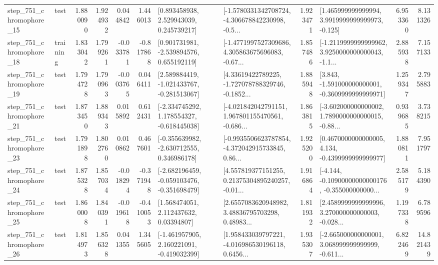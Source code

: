 \begin{tabular}{llrrrrllrlrr}
  step\_751\_chromophore\_15 &      test &      1.880090 &    1.924932 &      0.044842 &  1.446013 &     [0.893458938, 2.529943039, 0.245739217] &  [-1.5780331342708724, -4.306678842230998, -0.5... &       1.923471 &    [1.465999999999994, 3.9919999999999973, -0.125] &            6.953360 &          8.131326 \\
  step\_751\_chromophore\_18 &  training &      1.833042 &    1.799261 &     -0.033781 & -0.817868 &    [0.901731981, -2.539894576, 0.655192119] &  [-1.4771997527309686, 4.305863675696083, -0.67... &       1.857486 &  [-1.2119999999999962, 3.9250000000000043, -1.1... &            2.885938 &          7.157133 \\
  step\_751\_chromophore\_19 &      test &      1.794728 &    1.790963 &     -0.003765 &  0.046411 &   [2.589884419, -1.021433767, -0.281513067] &  [4.33619422789225, -1.727078788329746, -0.1852... &       1.885948 &   [3.843, -1.591000000000001, -0.3609999999999971] &            1.259347 &          2.795883 \\
  step\_751\_chromophore\_21 &      test &      1.873450 &    1.889343 &      0.015892 &  0.612431 &   [-2.334745292, 1.178554327, -0.618445038] &  [-4.021842042791151, 1.967801155470561, -0.686... &       1.863815 &  [-3.602000000000002, 1.7890000000000015, -0.88... &            0.939685 &          3.738215 \\
  step\_751\_chromophore\_23 &      test &      1.791898 &    1.802760 &      0.010862 &  0.467601 &   [-0.355639982, -2.630712555, 0.346986178] &  [-0.9935506623787854, -4.372042915733845, 0.86... &       1.925200 &   [0.4670000000000005, 4.134, -0.4399999999999977] &            1.880811 &          7.951797 \\
  step\_751\_chromophore\_24 &      test &      1.875328 &    1.857034 &     -0.018294 & -0.371948 &  [-2.682196459, -0.059103476, -0.351698479] &  [4.557819377151255, 0.21375304895240257, -0.01... &       1.916864 &  [-4.144, -0.10900000000000176, -0.355000000000... &            2.585179 &          5.184390 \\
  step\_751\_chromophore\_25 &      test &      1.860008 &    1.840391 &     -0.019618 & -0.410053 &      [1.568474051, 2.112437632, 0.03394807] &  [2.6557083620948982, 3.48836795703298, 0.48983... &       1.811932 &  [2.4589999999999996, 3.270000000000003, -0.028... &            1.197338 &          6.789596 \\
  step\_751\_chromophore\_26 &      test &      1.814973 &    1.856328 &      0.041355 &  1.345605 &   [-1.461957905, 2.160221091, -0.419032399] &  [1.958433039797221, -4.016986530196118, 0.6456... &       1.935307 &  [-2.665000000000001, 3.068999999999999, -0.611... &            6.822469 &         14.821439 \\

\end{tabular}
